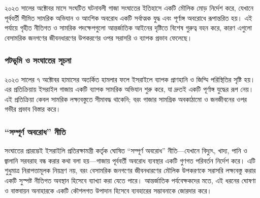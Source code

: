 ২০২৩ সালের অক্টোবর মাসে সংঘটিত ঘটনাবলী গাজা সংঘাতের ইতিহাসে একটি মৌলিক
মোড় নির্দেশ করে, যেখানে পূর্ববর্তী সীমিত সামরিক অভিযান ও আংশিক অবরোধ একটি
সর্বাত্মক যুদ্ধ এবং পূর্ণাঙ্গ অবরোধে রূপান্তরিত হয়। এই পর্যায়ে গৃহীত নীতিগত ও
সামরিক পদক্ষেপগুলো আন্তর্জাতিক আইনের দৃষ্টিতে বিশেষ গুরুত্ব বহন করে, কারণ এগুলো
বেসামরিক জনগণের জীবনধারণের উপকরণের ওপর সরাসরি ও ব্যাপক প্রভাব ফেলেছে।

\subsubsection{পটভূমি ও সংঘাতের
সূচনা}\label{ux9aaux99fux9adux9ae-ux993-ux9b8ux998ux9a4ux9b0-ux9b8ux99aux9a8}

২০২৩ সালের ৭ অক্টোবর হামাসের অতর্কিত হামলার ফলে ইসরাইলে ব্যাপক প্রাণহানি ও
জিম্মি পরিস্থিতির সৃষ্টি হয়। এর প্রতিক্রিয়ায় ইসরাইল গাজায় একটি ব্যাপক সামরিক
অভিযান শুরু করে, যা দ্রুতই একটি পূর্ণাঙ্গ যুদ্ধের রূপ নেয়। এই প্রতিক্রিয়া কেবল
সামরিক লক্ষ্যবস্তুতে সীমাবদ্ধ থাকেনি; বরং গাজার সামগ্রিক অবকাঠামো ও জনজীবনের
ওপর গভীর প্রভাব বিস্তার করে।
\vspace{0.3em}

\subsubsection{\texorpdfstring{``সম্পূর্ণ অবরোধ'' নীতি
}{``সম্পূর্ণ অবরোধ'' নীতি }}\label{ux9b8ux9aeux9aaux9b0ux9a3-ux985ux9acux9b0ux9a7-ux9a8ux9a4}

সংঘাতের প্রারম্ভেই ইসরাইলি প্রতিরক্ষামন্ত্রী কর্তৃক ঘোষিত ``সম্পূর্ণ অবরোধ''
নীতি---যেখানে বিদ্যুৎ, খাদ্য, পানি ও জ্বালানি সরবরাহ বন্ধ করার কথা বলা
হয়---গাজায় পূর্ববর্তী অবরোধ ব্যবস্থার একটি গুণগত পরিবর্তন নির্দেশ করে। এটি
শুধুমাত্র নিরাপত্তামূলক নিয়ন্ত্রণ নয়, বরং বেসামরিক জনগণের জীবনধারণের মৌলিক
উপকরণকে সরাসরি লক্ষ্যবস্তু করার একটি সুস্পষ্ট নীতিগত অবস্থান হিসেবে ব্যাখ্যা করা
যেতে পারে। আন্তর্জাতিক পর্যবেক্ষকদের মতে, এই ধরনের ঘোষণা ও বাস্তবায়ন অনাহারকে
একটি কৌশলগত উপাদান হিসেবে ব্যবহারের সম্ভাবনাকে জোরদার করে।
\vspace{0.3em}

